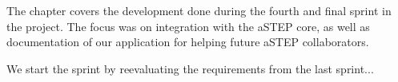 The chapter covers the development done during the fourth and final sprint in the project. The focus was on integration with the aSTEP core, as well as documentation of our application for helping future aSTEP collaborators.

We start the sprint by reevaluating the requirements from the last sprint... 